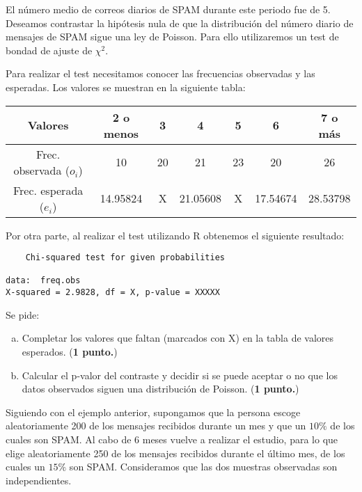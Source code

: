 \documentclass[12pt]{article}\usepackage[]{graphicx}\usepackage[]{color}
\newcounter{problemes}
\newcounter{punts} \def\thepunts{\arabic{punts}}
\def\probl{\addtocounter{problemes}{1} \setcounter{punts}{0}
\medskip\noindent{\bf \theproblemes) }}
\begin{document}
\noindent
El número medio de correos diarios de SPAM durante este periodo
fue de 5. Deseamos contrastar la hipótesis nula de que la distribución del número
diario de mensajes de SPAM sigue una ley de Poisson. Para ello utilizaremos
un test de bondad de ajuste de $\chi^2$.

Para realizar el test necesitamos conocer las frecuencias observadas y las esperadas.
Los valores se muestran en la siguiente tabla:


\begin{center}
\begin{tabular}{|c|cccccc|}
\hline
Valores & 2 o menos & 3 & 4 & 5 & 6 & 7 o más\\ \hline
Frec. observada ($o_i$) & 10 & 20 & 21 & 23 & 20 & 26 \\ \hline
Frec. esperada ($e_i$)& 14.95824 & X & 21.05608 & X & 17.54674 & 28.53798 \\ \hline
\end{tabular}
\end{center}

Por otra parte, al realizar el test utilizando R obtenemos el siguiente 
resultado:

\begin{verbatim}
	Chi-squared test for given probabilities

data:  freq.obs
X-squared = 2.9828, df = X, p-value = XXXXX
\end{verbatim}

Se pide:
\begin{enumerate}[a)]
\item Completar los valores que faltan (marcados con X) en la tabla de valores esperados. (\textbf{1 punto.})
\item Calcular el p-valor del contraste y decidir si se puede aceptar
o no que los datos observados siguen una distribución de Poisson. (\textbf{1 punto.})
\end{enumerate}

% 
% 
% 



\probl Siguiendo con el ejemplo anterior, supongamos que 
la persona escoge aleatoriamente 200 de los mensajes recibidos 
durante un mes y que un $10\%$ de los cuales son SPAM.
Al cabo de 6 meses vuelve a realizar el estudio, para lo que elige
aleatoriamente 250 de los mensajes recibidos durante el último
mes, de los cuales un $15\%$ son SPAM. Consideramos que las dos
muestras observadas son independientes.
\end{document}
